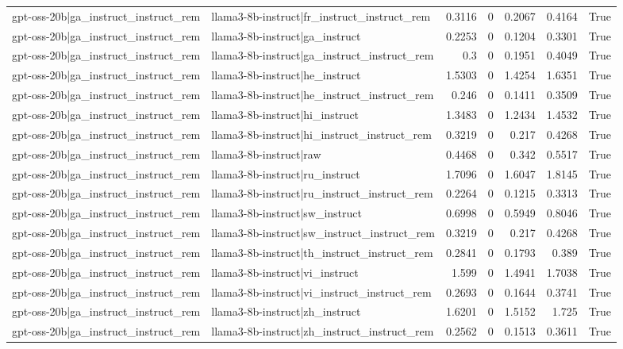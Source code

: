 \begin{table}
\begin{tabular}{l l r r r r l}
gpt-oss-20b|ga_instruct_instruct_rem & llama3-8b-instruct|fr_instruct_instruct_rem & 0.3116 & 0 & 0.2067 & 0.4164 & True \\
gpt-oss-20b|ga_instruct_instruct_rem & llama3-8b-instruct|ga_instruct & 0.2253 & 0 & 0.1204 & 0.3301 & True \\
gpt-oss-20b|ga_instruct_instruct_rem & llama3-8b-instruct|ga_instruct_instruct_rem & 0.3 & 0 & 0.1951 & 0.4049 & True \\
gpt-oss-20b|ga_instruct_instruct_rem & llama3-8b-instruct|he_instruct & 1.5303 & 0 & 1.4254 & 1.6351 & True \\
gpt-oss-20b|ga_instruct_instruct_rem & llama3-8b-instruct|he_instruct_instruct_rem & 0.246 & 0 & 0.1411 & 0.3509 & True \\
gpt-oss-20b|ga_instruct_instruct_rem & llama3-8b-instruct|hi_instruct & 1.3483 & 0 & 1.2434 & 1.4532 & True \\
gpt-oss-20b|ga_instruct_instruct_rem & llama3-8b-instruct|hi_instruct_instruct_rem & 0.3219 & 0 & 0.217 & 0.4268 & True \\
gpt-oss-20b|ga_instruct_instruct_rem & llama3-8b-instruct|raw & 0.4468 & 0 & 0.342 & 0.5517 & True \\
gpt-oss-20b|ga_instruct_instruct_rem & llama3-8b-instruct|ru_instruct & 1.7096 & 0 & 1.6047 & 1.8145 & True \\
gpt-oss-20b|ga_instruct_instruct_rem & llama3-8b-instruct|ru_instruct_instruct_rem & 0.2264 & 0 & 0.1215 & 0.3313 & True \\
gpt-oss-20b|ga_instruct_instruct_rem & llama3-8b-instruct|sw_instruct & 0.6998 & 0 & 0.5949 & 0.8046 & True \\
gpt-oss-20b|ga_instruct_instruct_rem & llama3-8b-instruct|sw_instruct_instruct_rem & 0.3219 & 0 & 0.217 & 0.4268 & True \\
gpt-oss-20b|ga_instruct_instruct_rem & llama3-8b-instruct|th_instruct_instruct_rem & 0.2841 & 0 & 0.1793 & 0.389 & True \\
gpt-oss-20b|ga_instruct_instruct_rem & llama3-8b-instruct|vi_instruct & 1.599 & 0 & 1.4941 & 1.7038 & True \\
gpt-oss-20b|ga_instruct_instruct_rem & llama3-8b-instruct|vi_instruct_instruct_rem & 0.2693 & 0 & 0.1644 & 0.3741 & True \\
gpt-oss-20b|ga_instruct_instruct_rem & llama3-8b-instruct|zh_instruct & 1.6201 & 0 & 1.5152 & 1.725 & True \\
gpt-oss-20b|ga_instruct_instruct_rem & llama3-8b-instruct|zh_instruct_instruct_rem & 0.2562 & 0 & 0.1513 & 0.3611 & True \\

\end{tabular}
\end{table}

